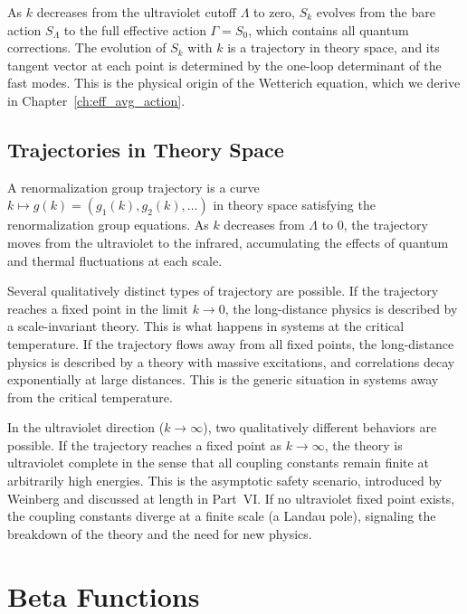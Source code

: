 \documentclass[11pt, twoside, openright]{book}
\theoremstyle{dotted}
\theoremstyle{definition}
\begin{document}
As $k$ decreases from the ultraviolet cutoff $\Lambda$ to zero, $S_k$ evolves from
the bare action $S_\Lambda$ to the full effective action $\Gamma = S_0$, which
contains all quantum corrections. The evolution of $S_k$ with $k$ is a trajectory
in theory space, and its tangent vector at each point is determined by the
one-loop determinant of the fast modes. This is the physical origin of the
Wetterich equation, which we derive in Chapter~\ref{ch:eff_avg_action}.

\section{Trajectories in Theory Space}

A renormalization group trajectory is a curve $k \mapsto g(k) = (g_1(k), g_2(k),
\ldots)$ in theory space satisfying the renormalization group equations. As $k$
decreases from $\Lambda$ to $0$, the trajectory moves from the ultraviolet to the
infrared, accumulating the effects of quantum and thermal fluctuations at each scale.

Several qualitatively distinct types of trajectory are possible. If the trajectory
reaches a fixed point in the limit $k \to 0$, the long-distance physics is
described by a scale-invariant theory. This is what happens in systems at the
critical temperature. If the trajectory flows away from all fixed points, the
long-distance physics is described by a theory with massive excitations, and
correlations decay exponentially at large distances. This is the generic situation
in systems away from the critical temperature.

In the ultraviolet direction ($k \to \infty$), two qualitatively different
behaviors are possible. If the trajectory reaches a fixed point as $k \to \infty$,
the theory is ultraviolet complete in the sense that all coupling constants remain
finite at arbitrarily high energies. This is the asymptotic safety scenario,
introduced by Weinberg and discussed at length in Part~VI. If no ultraviolet fixed
point exists, the coupling constants diverge at a finite scale (a Landau pole),
signaling the breakdown of the theory and the need for new physics.

\chapter{Beta Functions}
\label{ch:beta_functions}
\end{document}
